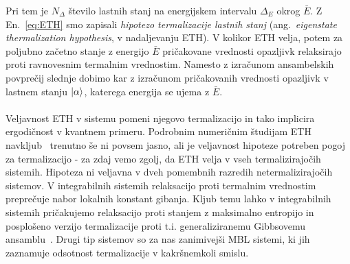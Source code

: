 Pri tem je $N_\Delta$ število lastnih stanj na energijskem intervalu $\Delta_E$ okrog $\bar{E}.$ Z En.~\eqref{eq:ETH} smo zapisali \emph{hipotezo termalizacije lastnih stanj} (ang.~\emph{eigenstate thermalization hypothesis}, v nadaljevanju ETH). V kolikor ETH velja, potem za poljubno začetno stanje z energijo $\bar{E}$ pričakovane vrednosti opazljivk relaksirajo proti ravnovesnim termalnim vrednostim. Namesto z izračunom ansambelskih povprečij slednje dobimo kar z izračunom pričakovanih vrednosti opazljivk v lastnem stanju $\vert\alpha\rangle$, katerega energija se ujema z $\bar{E}.$\\\\
Veljavnost ETH v sistemu pomeni njegovo termalizacijo in tako implicira ergodičnost v kvantnem primeru. Podrobnim numeričnim študijam ETH navkljub~\cite{d2016quantum} trenutno še ni povsem jasno, ali je veljavnost hipoteze potreben pogoj za termalizacijo - za zdaj vemo zgolj, da ETH velja v vseh termalizirajočih sistemih. Hipoteza ni veljavna v dveh pomembnih razredih netermalizirajočih sistemov. V integrabilnih sistemih relaksacijo proti termalnim vrednostim preprečuje nabor lokalnih konstant  gibanja. Kljub temu lahko v integrabilnih sistemih pričakujemo relaksacijo proti stanjem z maksimalno entropijo in posplošeno verzijo termalizacije proti t.i. generaliziranemu Gibbsovemu ansamblu~\cite{rigol2008thermalization}. Drugi tip sistemov so za nas zanimivejši MBL sistemi, ki jih zaznamuje odsotnost termalizacije v kakršnemkoli smislu. 
